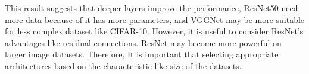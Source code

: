 \documentclass[extendedabs]{bmvc2k}
\begin{document}
This result suggests that deeper layers improve the performance, ResNet50 need more data because of it has more parameters, and VGGNet may be more suitable for less complex dataset like CIFAR-10. However, it is useful to consider ResNet's advantages like residual connections. ResNet may become more powerful on larger image datasets. Therefore, It is important that selecting appropriate architectures based on the characteristic like size of the datasets.

\newpage

\end{document}
